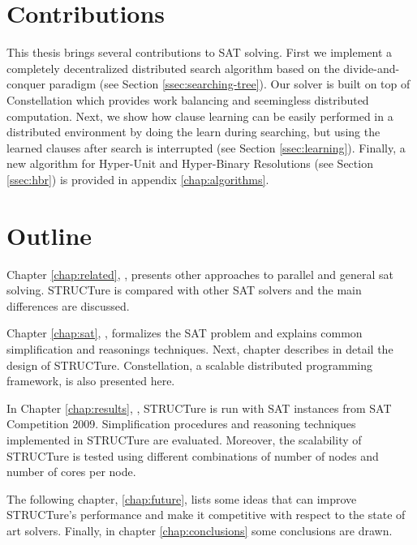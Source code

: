 \section{Contributions}

This thesis brings several contributions to SAT solving. First
we implement a completely decentralized distributed search
algorithm based on the divide-and-conquer paradigm (see Section
\ref{ssec:searching-tree}).  Our solver is built on top of
Constellation which provides work balancing and seemingless
distributed computation.  Next, we show how clause learning can be
easily performed in a distributed environment by doing the learn
during searching, but using the learned clauses after search is
interrupted (see Section \ref{ssec:learning}).  Finally, a new
algorithm for Hyper-Unit and Hyper-Binary Resolutions (see Section
\ref{ssec:hbr}) is provided in appendix \ref{chap:algorithms}.


\section{Outline}

Chapter \ref{chap:related}, \emph{}, presents other
approaches to parallel and general sat solving. STRUCTure is compared
with other SAT solvers and the main differences are discussed.

Chapter \ref{chap:sat}, \emph{}, formalizes the SAT
problem and explains common simplification and reasonings techniques.
Next, chapter \emph{} describes in detail
the design of STRUCTure. Constellation, a scalable distributed
programming framework, is also presented here.

In Chapter \ref{chap:results}, \emph{}, STRUCTure is
run with SAT instances from SAT Competition 2009. Simplification
procedures and reasoning techniques implemented in STRUCTure are
evaluated. Moreover, the scalability of STRUCTure is tested using
different combinations of number of nodes and number of cores
per node.

The following chapter, \ref{chap:future}, lists some ideas that can
improve STRUCTure's performance and make it competitive with respect
to the state of art solvers. Finally, in chapter \ref{chap:conclusions}
some conclusions are drawn.
